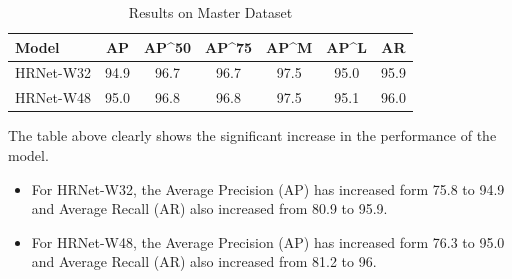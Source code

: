 \documentclass[a4paper,12pt]{article}
\begin{document}
\begin{table}[h]
\begin{center}
\begin{tabular}{ l | c | c | c | c | c | c}
Model & AP & AP^{50} & AP^{75} & AP^{M} & AP^{L} & AR \\
\hline \hline
HRNet-W32 & 94.9 & 96.7 & 96.7 & 97.5 & 95.0 & 95.9 \\
HRNet-W48 & 95.0 & 96.8 & 96.8 & 97.5 & 95.1 & 96.0 \\
\end{tabular}
\caption{Results on Master Dataset}
\label{tab:caption}
\end{center}
\end{table}

The table above clearly shows the significant increase in the performance of the model.
\begin{itemize}
    \item For HRNet-W32, the Average Precision (AP) has increased form 75.8 to 94.9 and Average Recall (AR) also increased from 80.9 to 95.9.
    
    \item For HRNet-W48, the Average Precision (AP) has increased form 76.3 to 95.0 and Average Recall (AR) also increased from 81.2 to 96.
\end{itemize}
\end{document}
